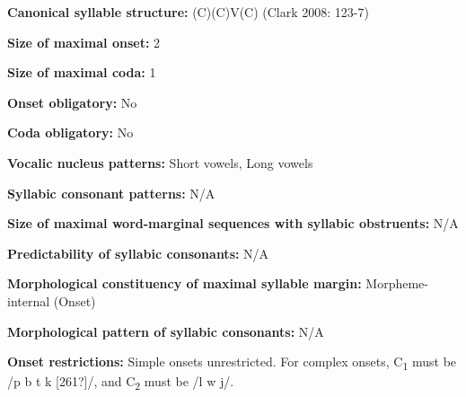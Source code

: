 \begin{styleBody}
\textbf{Canonical syllable structure:} (C)(C)V(C)\textbf{ }(Clark 2008: 123-7)
\end{styleBody}

\begin{styleBody}
\textbf{Size of maximal onset:} 2
\end{styleBody}

\begin{styleBody}
\textbf{Size of maximal coda:} 1
\end{styleBody}

\begin{styleBody}
\textbf{Onset obligatory:} No
\end{styleBody}

\begin{styleBody}
\textbf{Coda obligatory:} No
\end{styleBody}

\begin{styleBody}
\textbf{Vocalic nucleus patterns:} Short vowels, Long vowels
\end{styleBody}

\begin{styleBody}
\textbf{Syllabic consonant patterns:} N/A
\end{styleBody}

\begin{styleBody}
\textbf{Size of maximal word{}-marginal sequences with syllabic obstruents:} N/A
\end{styleBody}

\begin{styleBody}
\textbf{Predictability of syllabic consonants:} N/A
\end{styleBody}

\begin{styleBody}
\textbf{Morphological constituency of maximal syllable margin:} Morpheme-internal (Onset)
\end{styleBody}

\begin{styleBody}
\textbf{Morphological pattern of syllabic consonants:} N/A
\end{styleBody}

\begin{styleBody}
\textbf{Onset restrictions:} Simple onsets unrestricted. For complex onsets, C\textsubscript{1} must be /p b t k [261?]/, and C\textsubscript{2} must be /l w j/. 
\end{styleBody}

